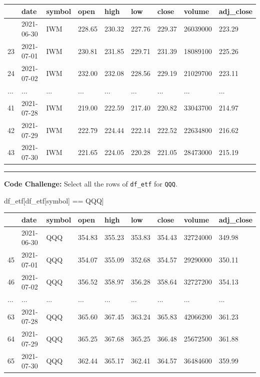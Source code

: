 \documentclass[
  letterpaper,
  DIV=11,
  numbers=noendperiod]{scrreprt}
\newenvironment{Shaded}{\begin{snugshade}}{\end{snugshade}}
\newcommand{\NormalTok}[1]{\textcolor[rgb]{0.00,0.23,0.31}{#1}}
\newcommand{\OperatorTok}[1]{\textcolor[rgb]{0.37,0.37,0.37}{#1}}
\newcommand{\StringTok}[1]{\textcolor[rgb]{0.13,0.47,0.30}{#1}}
\begin{document}
\begin{longtable}[]{@{}lllllllll@{}}
\toprule\noalign{}
& date & symbol & open & high & low & close & volume & adj\_close \\
\midrule\noalign{}
\endhead
\bottomrule\noalign{}
\endlastfoot
22 & 2021-06-30 & IWM & 228.65 & 230.32 & 227.76 & 229.37 & 26039000 &
223.29 \\
23 & 2021-07-01 & IWM & 230.81 & 231.85 & 229.71 & 231.39 & 18089100 &
225.26 \\
24 & 2021-07-02 & IWM & 232.00 & 232.08 & 228.56 & 229.19 & 21029700 &
223.11 \\
... & ... & ... & ... & ... & ... & ... & ... & ... \\
41 & 2021-07-28 & IWM & 219.00 & 222.59 & 217.40 & 220.82 & 33043700 &
214.97 \\
42 & 2021-07-29 & IWM & 222.79 & 224.44 & 222.14 & 222.52 & 22634800 &
216.62 \\
43 & 2021-07-30 & IWM & 221.65 & 224.05 & 220.28 & 221.05 & 28473000 &
215.19 \\
\end{longtable}

\begin{center}\rule{0.5\linewidth}{0.5pt}\end{center}

\textbf{Code Challenge:} Select all the rows of \texttt{df\_etf} for
\texttt{QQQ}.

\begin{Shaded}
\begin{Highlighting}[]
\NormalTok{df\_etf[df\_etf[}\StringTok{\textquotesingle{}symbol\textquotesingle{}}\NormalTok{] }\OperatorTok{==} \StringTok{\textquotesingle{}QQQ\textquotesingle{}}\NormalTok{]}
\end{Highlighting}
\end{Shaded}

\begin{longtable}[]{@{}lllllllll@{}}
\toprule\noalign{}
& date & symbol & open & high & low & close & volume & adj\_close \\
\midrule\noalign{}
\endhead
\bottomrule\noalign{}
\endlastfoot
44 & 2021-06-30 & QQQ & 354.83 & 355.23 & 353.83 & 354.43 & 32724000 &
349.98 \\
45 & 2021-07-01 & QQQ & 354.07 & 355.09 & 352.68 & 354.57 & 29290000 &
350.11 \\
46 & 2021-07-02 & QQQ & 356.52 & 358.97 & 356.28 & 358.64 & 32727200 &
354.13 \\
... & ... & ... & ... & ... & ... & ... & ... & ... \\
63 & 2021-07-28 & QQQ & 365.60 & 367.45 & 363.24 & 365.83 & 42066200 &
361.23 \\
64 & 2021-07-29 & QQQ & 365.25 & 367.68 & 365.25 & 366.48 & 25672500 &
361.88 \\
65 & 2021-07-30 & QQQ & 362.44 & 365.17 & 362.41 & 364.57 & 36484600 &
359.99 \\
\end{longtable}
\end{document}
